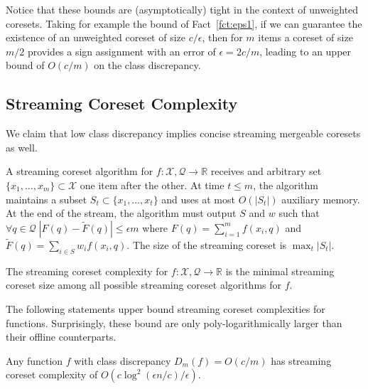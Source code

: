 \documentclass[anon,12pt]{colt2019} %
\newcommand{\R}{\mathbb{R}}
\newcommand{\eps}{\epsilon}
\newcommand{\X}{\mathcal{X}}
\newcommand{\Q}{\mathcal{Q}}
\begin{document}
Notice that these bounds are (asymptotically) tight in the context of unweighted coresets. Taking for example the bound of Fact~\ref{fct:eps1}, if we can guarantee the existence of an unweighted coreset of size $c/\eps$, then for $m$ items a coreset of size $m/2$ provides a sign assignment with an error of $\eps=2c/m$, leading to an upper bound of $O(c/m)$ on the class discrepancy.


\subsection{Streaming Coreset Complexity}\label{sec:sketch}
We claim that low class discrepancy implies concise streaming mergeable coresets as well. 
%
\begin{definition}  
A streaming coreset algorithm for $f:\X,\Q \rightarrow \R$ receives and arbitrary set $\{x_1,\ldots,x_m\} \subset \X$ one item after the other.
At time $t \le m$, the algorithm maintains a subset $S_t \subset \{x_1,\ldots,x_t\}$ and uses at most $O(|S_t|)$ auxiliary memory. 
At the end of the stream, the algorithm must output $S$ and $w$ such that  $\forall q \in \Q \; |F(q)  - \tilde F(q)| \le \eps m$ where 
$F(q) = \sum_{i=1}^{m} f(x_i,q)$ and $\tilde F(q) = \sum_{i \in S}w_i f(x_i,q)$.
The size of the streaming coreset is $\max_t |S_t|$.
\end{definition}

\begin{definition}  
The streaming coreset complexity for $f:\X,\Q \rightarrow \R$ is the minimal streaming coreset size among all possible 
streaming coreset algorithms for $f$.
\end{definition}


\noindent The following statements upper bound streaming coreset complexities for functions. Surprisingly, these bound are only poly-logarithmically larger than their offline counterparts. 

\begin{theorem} \label{thm:streaming11}
Any function $f$ with class discrepancy $D_m(f) = O(c/m)$ has streaming coreset complexity of $O\left(c\log^2(\eps n/c)/\eps\right)$.
\end{theorem}
\end{document}
